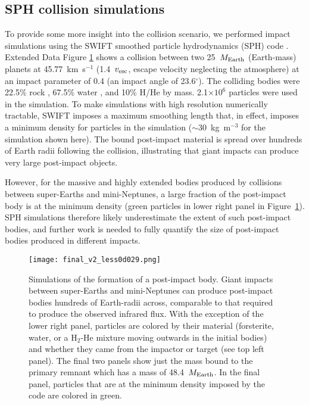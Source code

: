 \documentclass[sn-nature]{sn-jnl}%
\begin{document}
\subsection*{SPH collision simulations}

To provide some more insight into the collision scenario, we performed impact simulations using the SWIFT smoothed particle hydrodynamics (SPH) code \cite{Schaller2016,Schaller2018,Kegerreis2019}.
%
Extended Data Figure \ref{fig:SPH} shows a collision between two 25~$M_{\rm Earth}$ (Earth-mass) planets at 45.77~km~s$^{-1}$ (1.4~$v_{\rm esc}$, escape velocity neglecting the atmosphere) at an impact parameter of 0.4 (an impact angle of 23.6$^\circ$).
%
The colliding bodies were 22.5\% rock \cite[forsterite,][]{Stewart2019forsteriteEOS,Stewart2020_key_req_EOS}, 67.5\% water \cite{Senft2008}, and 10\% H/He \cite{Hubbard1980} by mass.
%
2.1$\times10^6$ particles were used in the simulation.
%
To make simulations with high resolution numerically tractable, SWIFT imposes a maximum smoothing length that, in effect, imposes a minimum density for particles in the simulation ($\sim30$~kg~m$^{-3}$ for the simulation shown here). 
%
The bound post-impact material is spread over hundreds of Earth radii following the collision, illustrating that giant impacts can produce very large post-impact objects. 

However, for the massive and highly extended bodies produced by collisions between super-Earths and mini-Neptunes, a large fraction of the post-impact body is at the minimum density (green particles in lower right panel in Figure~\ref{fig:SPH}).
%
SPH simulations therefore likely underestimate the extent of such post-impact bodies, and further work is needed to fully quantify the size of post-impact bodies produced in different impacts.

\begin{figure}
    \centering
    \texttt{[image: final\_v2\_less0d029.png]}
    \caption{Simulations of the formation of a post-impact body.
    Giant impacts between super-Earths and mini-Neptunes can produce post-impact bodies hundreds of Earth-radii across, comparable to that required to produce the observed infrared flux. With the exception of the lower right panel, particles are colored by their material (forsterite, water, or a H$_2$-He mixture moving outwards in the initial bodies) and whether they came from the impactor or target (see top left panel). The final two panels show just the mass bound to the primary remnant which has a mass of 48.4~$M_{\rm Earth}$. In the final panel, particles that are at the minimum density imposed by the code are colored in green.}
    \label{fig:SPH}
\end{figure}
\end{document}
